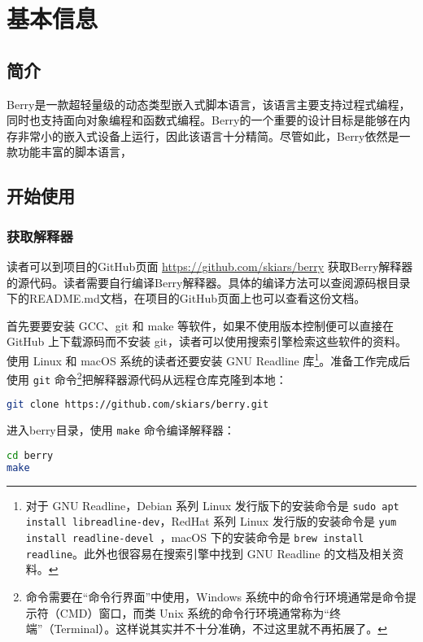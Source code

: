 \chapter{基本信息}

\section{简介}

Berry是一款超轻量级的动态类型嵌入式脚本语言，该语言主要支持过程式编程，同时也支持面向对象编程和函数式编程。Berry的一个重要的设计目标是能够在内存非常小的嵌入式设备上运行，因此该语言十分精简。尽管如此，Berry依然是一款功能丰富的脚本语言，

\section{开始使用}

\subsection{获取解释器}

读者可以到项目的GitHub页面 \url{https://github.com/skiars/berry} 获取Berry解释器的源代码。读者需要自行编译Berry解释器。具体的编译方法可以查阅源码根目录下的README.md文档，在项目的GitHub页面上也可以查看这份文档。

首先要要安装 GCC、git 和 make 等软件，如果不使用版本控制便可以直接在 GitHub 上下载源码而不安装 git，读者可以使用搜索引擎检索这些软件的资料。使用 Linux 和 macOS 系统的读者还要安装 GNU Readline 库\footnote{对于 GNU Readline，Debian 系列 Linux 发行版下的安装命令是 \texttt{sudo apt install libreadline-dev}，RedHat 系列 Linux 发行版的安装命令是 \texttt{yum install readline-devel }，macOS 下的安装命令是 \texttt{brew install readline}。此外也很容易在搜索引擎中找到 GNU Readline 的文档及相关资料。}。准备工作完成后使用 \texttt{git} 命令\footnote{命令需要在``命令行界面''中使用，Windows 系统中的命令行环境通常是命令提示符（CMD）窗口，而类 Unix 系统的命令行环境通常称为``终端''（Terminal）。这样说其实并不十分准确，不过这里就不再拓展了。}把解释器源代码从远程仓库克隆到本地：
\begin{lstlisting}[language=bash, numbers=none]
git clone https://github.com/skiars/berry.git
\end{lstlisting}
进入berry目录，使用 \texttt{make} 命令编译解释器：
\begin{lstlisting}[language=bash, numbers=none]
cd berry
make
\end{lstlisting}

